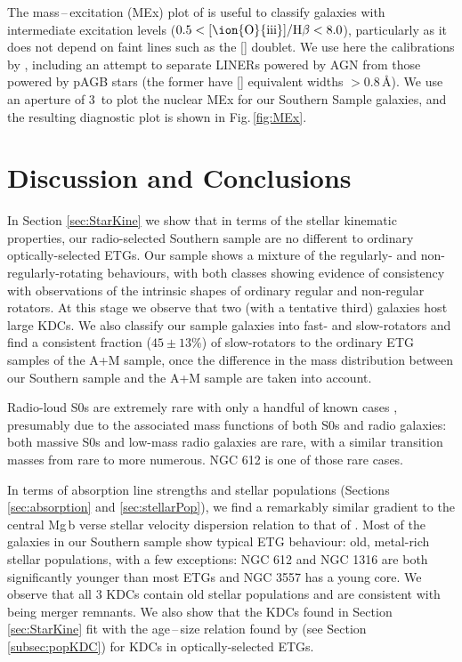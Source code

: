 \documentclass[a4paper,fleqn,usenatbib]{mnras}
\begin{document}
			The mass\,--\,excitation (MEx) plot of \citet{Juneau2011} is useful to classify galaxies with intermediate excitation levels ($0.5 < \mathrm{[\ion{O}{iii}]/H\beta} < 8.0$), particularly as it does not depend on faint lines such as the [] doublet. We use here the calibrations by \citet{Nyland2016}, including an attempt to separate LINERs powered by AGN from those powered by pAGB stars (the former have [] equivalent widths $>0.8$\,\AA). We use an aperture of 3\arcsec\ to plot the nuclear MEx for our Southern Sample galaxies, and the resulting diagnostic plot is shown in Fig.\,\ref{fig:MEx}. 

\section{Discussion and Conclusions}
	\label{sec:discuss}
	In Section \ref{sec:StarKine} we show that in terms of the stellar kinematic properties, our radio-selected Southern sample are no different to ordinary optically-selected ETGs. Our sample shows a mixture of the regularly- and non-regularly-rotating behaviours, with both classes showing evidence of consistency with observations of the intrinsic shapes of ordinary regular and non-regular rotators. At this stage we observe that two (with a tentative third) galaxies host large KDCs. We also classify our sample galaxies into fast- and slow-rotators and find a consistent fraction ($45\pm13$\%) of slow-rotators to the ordinary ETG samples of the A+M sample, once the difference in the mass distribution between our Southern sample and the A+M sample are taken into account.

	Radio-loud S0s are extremely rare with only a handful of known cases \citep[e.g.][]{Heckman1982, Morganti2011}, presumably due to the associated mass functions of both S0s and radio galaxies: both massive S0s and low-mass radio galaxies are rare, with a similar transition masses from rare to more numerous. NGC 612 is one of those rare cases.

	In terms of absorption line strengths and stellar populations (Sections \ref{sec:absorption} and \ref{sec:stellarPop}), we find a remarkably similar gradient to the central Mg\,b verse stellar velocity dispersion relation to that of \citet{Ziegler1997}. Most of the galaxies in our Southern sample show typical ETG behaviour: old, metal-rich stellar populations, with a few exceptions: NGC 612 and NGC 1316 are both significantly younger than most ETGs and NGC 3557 has a young core. We observe that all 3 KDCs contain old stellar populations and are consistent with being merger remnants. We also show that the KDCs found in Section \ref{sec:StarKine} fit with the age\,--\,size relation found by \citet{Kuntschner2010} (see Section \ref{subsec:popKDC}) for KDCs in optically-selected ETGs.
\end{document}
